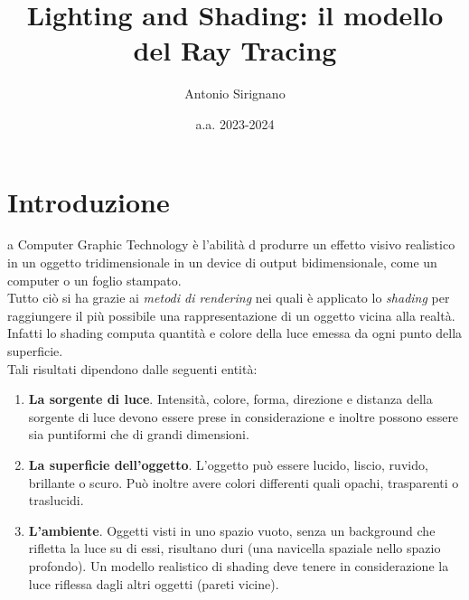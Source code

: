 \documentclass[9pt,a4paper,twoside]{tau}
\title{Lighting and Shading: il modello del Ray Tracing}
\author{Antonio Sirignano}
\date{a.a. 2023-2024}
\begin{document}
		
	\maketitle
	\thispagestyle{firststyle}
	\tauabstract
	\tableofcontents


\section{Introduzione}

    a Computer Graphic Technology è l'abilità d produrre un effetto visivo realistico in un oggetto tridimensionale in un device di output bidimensionale, come un computer o un foglio stampato.\\
    Tutto ciò si ha grazie ai \textit{metodi di rendering} nei quali è applicato lo \textit{shading} per raggiungere il più possibile una rappresentazione di un oggetto vicina alla realtà.\\ 
    Infatti lo shading computa quantità e colore della luce emessa da ogni punto della superficie.\\
    Tali risultati dipendono dalle seguenti entità:
    \begin{enumerate}
    	\item \textbf{La sorgente di luce}. Intensità, colore, forma, direzione e distanza della sorgente di luce devono essere prese in considerazione e inoltre possono essere sia puntiformi che di grandi dimensioni.
    	\item \textbf{La superficie dell'oggetto}. L'oggetto può essere lucido, liscio, ruvido, brillante o scuro. Può inoltre avere colori differenti quali opachi, trasparenti o traslucidi. 
    	\item \textbf{L'ambiente}. Oggetti visti in uno spazio vuoto, senza un background che rifletta la luce su di essi, risultano duri (una navicella spaziale nello spazio profondo). Un modello realistico di shading deve tenere in considerazione la luce riflessa dagli altri oggetti (pareti vicine).
    \end{enumerate}
\end{document}
